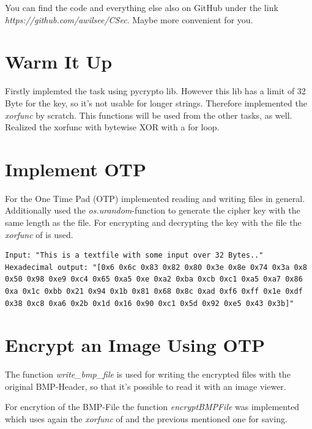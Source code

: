 You can find the code and everything else also on GitHub under the link \textit{https://github.com/awilsee/CSec}. Maybe more convenient for you.


\section{Warm It Up}


Firstly implemted the task using pycrypto lib. However this lib has a limit of 32 Byte for the key, so it's not usable for longer strings. Therefore implemented the \textit{xorfunc} by scratch. This functions will be used from the other tasks, as well. Realized the xorfunc with bytewise XOR with a for loop.\\


\section{Implement OTP}


For the One Time Pad (OTP) implemented reading and writing files in general. Additionally used the \textit{os.urandom}-function to generate the cipher key with the same length as the file. For encrypting and decrypting the key with the file the \textit{xorfunc} of  is used.

\begin{lstlisting}
Input: "This is a textfile with some input over 32 Bytes.."
Hexadecimal output: "[0x6 0x6c 0x83 0x82 0x80 0x3e 0x8e 0x74 0x3a 0x8 0x50 0x98 0xe9 0xc4 0x65 0xa5 0xe 0xa2 0xba 0xcb 0xc1 0xa5 0xa7 0x86 0xa 0x1c 0xbb 0x21 0x94 0x1b 0x81 0x68 0x8c 0xad 0xf6 0xff 0x1e 0xdf 0x38 0xc8 0xa6 0x2b 0x1d 0x16 0x90 0xc1 0x5d 0x92 0xe5 0x43 0x3b]"
\end{lstlisting}


\section{Encrypt an Image Using OTP}


The function \textit{write\_bmp\_file} is used for writing the encrypted files with the original BMP-Header, so that it's possible to read it with an image viewer.

For encrytion of the BMP-File the function \textit{encryptBMPFile} was implemented which uses again the \textit{xorfunc} of  and the previous mentioned one for saving.

